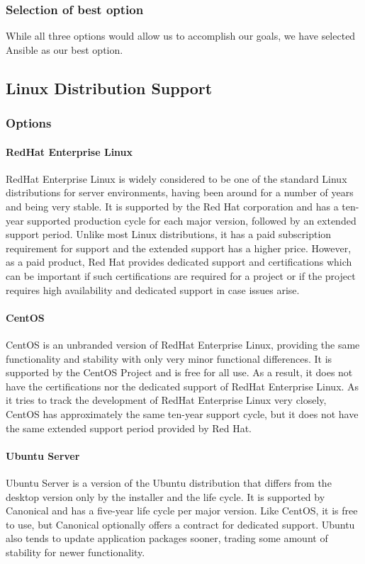 \documentclass[10pt,letterpaper,onecolumn,draftclsnofoot]{IEEEtran}
\begin{document}
\subsubsection{Selection of best option}
While all three options would allow us to accomplish our goals, we have selected Ansible as our best option.

\subsection{Linux Distribution Support}
\subsubsection{Options}
\paragraph{RedHat Enterprise Linux}
RedHat Enterprise Linux is widely considered to be one of the standard Linux distributions for server environments, having been around for a number of years and being very stable. It is supported by the Red Hat corporation and has a ten-year supported production cycle for each major version, followed by an extended support period\cite{rhlife}. Unlike most Linux distributions, it has a paid subscription requirement for support and the extended support has a higher price. However, as a paid product, Red Hat provides dedicated support and certifications which can be important if such certifications are required for a project or if the project requires high availability and dedicated support in case issues arise.
\paragraph{CentOS}
CentOS is an unbranded version of RedHat Enterprise Linux, providing the same functionality and stability with only very minor functional differences. It is supported by the CentOS Project and is free for all use. As a result, it does not have the certifications nor the dedicated support of RedHat Enterprise Linux. As it tries to track the development of RedHat Enterprise Linux very closely, CentOS has approximately the same ten-year support cycle\cite{centlife}, but it does not have the same extended support period provided by Red Hat.
\paragraph{Ubuntu Server}
Ubuntu Server is a version of the Ubuntu distribution that differs from the desktop version only by the installer and the life cycle\cite{ubuntulife}. It is supported by Canonical and has a five-year life cycle per major version. Like CentOS, it is free to use, but Canonical optionally offers a contract for dedicated support. Ubuntu also tends to update application packages sooner, trading some amount of stability for newer functionality.
\end{document}
